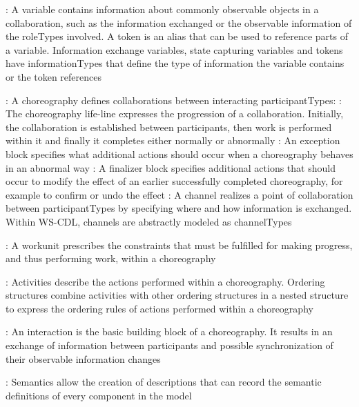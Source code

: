 \documentclass{note}
\begin{document}
\w {}: A variable contains information
about commonly observable objects in a collaboration, such as the information
exchanged or the observable information of the roleTypes involved. A token is
an alias that can be used to reference parts of a variable. Information
exchange variables, state capturing variables and tokens have informationTypes
that define the type of information the variable contains or the token
references 

\w {}: A choreography defines collaborations between
interacting participantTypes:
     \bit
     \w {}: The choreography life-line expresses the
     progression of a collaboration. Initially, the collaboration is
     established between participants, then work is performed within it and
     finally it completes either normally or abnormally 
     \w {}: An exception block specifies what
     additional actions should occur when a choreography behaves in an
     abnormal way 
     \w {}: A finalizer block specifies
     additional actions that should occur to modify the effect of an earlier
     successfully completed choreography, for example to confirm or undo the
     effect 
     \eit
\w {}: A channel realizes a point of collaboration between
participantTypes by specifying where and how information is exchanged. Within
WS-CDL, channels are abstractly modeled as channelTypes 

\w {}: A workunit prescribes the constraints that must be fulfilled
for making progress, and thus performing work, within a choreography 

\w {}: Activities describe the actions
performed within a choreography. Ordering structures combine activities with
other ordering structures in a nested structure to express the ordering rules
of actions performed within a choreography 

\w {}: An interaction is the basic building block of a
choreography. It results in an exchange of information between participants
and possible synchronization of their observable information changes 

\w {}: Semantics allow the creation of descriptions that can
record the semantic definitions of every component in the model
\eit
\end{document}
